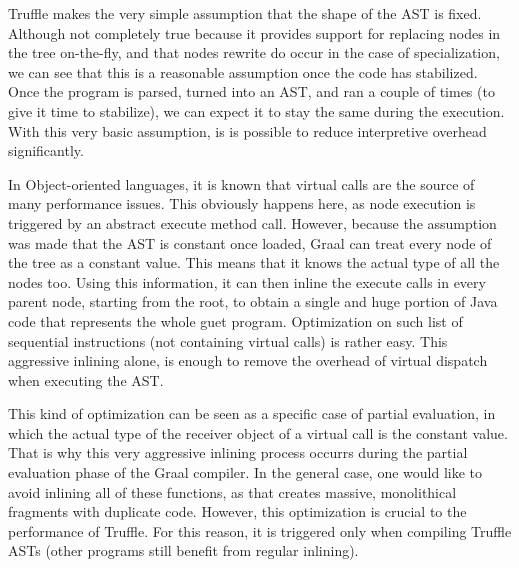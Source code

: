 \documentclass[twoside,11pt,a4paper]{article}
\newcommand{\java}[1]{\textsf{#1}}
\begin{document}
Truffle makes the very simple assumption that the shape of the AST is fixed. Although not completely true because it provides support for replacing nodes in the tree on-the-fly, and that nodes rewrite do occur in the case of specialization, we can see that this is a reasonable assumption once the code has stabilized. Once the program is parsed, turned into an AST, and ran a couple of times (to give it time to stabilize), we can expect it to stay the same during the execution. With this very basic assumption, is is possible to reduce interpretive overhead significantly.

In Object-oriented languages, it is known that virtual calls are the source of many performance issues. This obviously happens here, as node execution is triggered by an abstract \java{execute} method call. However, because the assumption was made that the AST is constant once loaded, Graal can treat every node of the tree as a constant value. This means that it knows the actual type of all the nodes too. Using this information, it can then inline the \java{execute} calls in every parent node, starting from the root, to obtain a single and huge portion of Java code that represents the whole guet program. Optimization on such list of sequential instructions (not containing virtual calls) is rather easy. This aggressive inlining alone, is enough to remove the overhead of virtual dispatch when executing the AST.

This kind of optimization can be seen as a specific case of partial evaluation, in which the actual type of the receiver object of a virtual call is the constant value. That is why this very aggressive inlining process occurrs during the partial evaluation phase of the Graal compiler. In the general case, one would like to avoid inlining all of these functions, as that creates massive, monolithical fragments with duplicate code. However, this optimization is crucial to the performance of Truffle. For this reason, it is triggered only when compiling Truffle ASTs (other programs still benefit from regular inlining).
\end{document}
